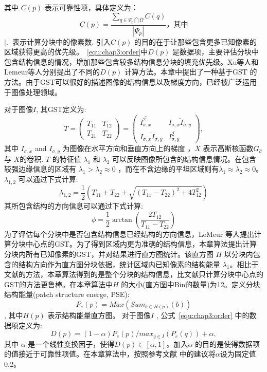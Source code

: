  其中 \(C(p)\) 表示可靠性项\cite{Criminisi04regionfilling}，具体定义为： $$C(p)=\frac{\sum_{q\in\Psi_p\bigcap\overline{\Omega}}{C(q)}}{\left\vert{\Psi_p}\right\vert}，其中$$\(\left\vert.\right\vert\)  表示计算分块中的像素数. 引入\(C(p)\) 的目的在于让那些包含更多已知像素的区域获得更高的优先级。~\ref{equ:chap3:order}中\(D(p)\) 是数据项，主要评估分块中包含结构信息的情况，增加那些包含较多结构信息分块的填充优先级。Xu等人\cite{Xu:2010}和Lemeur等人\cite{LeMeur_2011}分别提出了不同的\(D(p)\) 计算方法。本章中提出了一种基于GST 的方法。由于GST可以很好的描述图像的结构信息以及梯度方向，已经被广泛运用于图像处理领域\cite{Kothe03edgeand}。 \par
  对于图像\(I\), 其GST定义为:
  $$T=\left(\begin{array}{cc}T_{11} & T_{12} \\ T_{21} &T_{22}\end{array}\right)=\left(\begin{array}{cc}\overline{I_{\sigma,x}^2} & \overline{I_{\sigma,x}I_{\sigma,y}} \\ \overline{I_{\sigma,x}I_{\sigma,y}} & \overline{I_{\sigma,y}^2}\end{array}\right),$$
  其中 \(I_{\sigma,x}\) and \(I_{\sigma,y}\)  为图像在水平方向和垂直方向上的梯度 ，\(\overline{X}\) 表示高斯核函数\(G_{\hat{\sigma}}\) 与 \(X\)的卷积. \(T\) 的特征值 \(\lambda_1\) 和 \(\lambda_2\) 可以反映图像所包含的结构信息情况。在包含较强边缘信息的区域有 \(\lambda_1>\lambda_2\approx0\) ，而在不含边缘的平坦区域则有\(\lambda_1\approx\lambda_2\approx0\)。 \( \lambda_{1,2} \) 可以通过下式计算: $$\lambda_{1,2}=\frac{1}{2}\left(T_{11}+T_{22}\pm\sqrt{\left(T_{11}-T_{22}\right)^2+4T^2_{12}}\right)$$
  其所包含结构的方向信息可以通过下式计算:
 $$\phi=\frac{1}{2}\arctan{\left(\frac{2T_{12}}{T_{11}-T_{22}}\right)}$$
 为了评估每个分块中是否包含结构信息已经结构的方向信息，LeMeur
 等人\cite{LeMeur_2011}提出计算分块中心点的GST。为了得到区域内更为准确的结构信息，本章算法提出计算分块内所有已知像素的GST，并对结果进行直方图统计。该直方图 \(H\) 以分块内包含的结构方向作为直方图分块依据，统计区域内已知像素的结构能量 \(\lambda_1\)。相比于文献\cite{LeMeur_2011}的方法，本章算法得到的是整个分块的结构信息，比文献\cite{LeMeur_2011}只计算分块中心点的GST的方法更鲁棒。在本章算法中\(H\) 的大小(直方图中Bin的数量)为12。定义分块结构能量(patch structure energe, PSE):
 $$P_e\left(p\right)=Max\left(Sum_{b\in{H\left(p\right)}}\left(b\right)\right)$$, 其中\(H\left(p\right)\) 表示结构能量直方图。 对于图像\(I\) , 公式~\ref{equ:chap3:order} 中的数据项定义为:
 $$D(p)=(1-\alpha)P_e(p)/max_{q\in{I}}(P_e(q))+\alpha,$$ 其中 \(\alpha\) 是一个线性变换因子，使得\(D(p)\in{[\alpha,1]}\)。加入\(\alpha\) 的目的是使得数据项的值接近于可靠性项值。在本章算法中，按照参考文献\cite{Xu:2010} 中的建议将\(\alpha\)设为固定值0.2。
